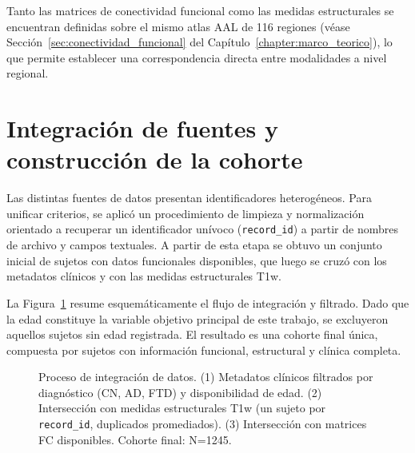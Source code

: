 Tanto las matrices de conectividad funcional como las medidas estructurales se encuentran definidas sobre el mismo atlas AAL de 116 regiones (véase Sección~\ref{sec:conectividad_funcional} del Capítulo~\ref{chapter:marco_teorico}), lo que permite establecer una correspondencia directa entre modalidades a nivel regional.


\section{Integración de fuentes y construcción de la cohorte}
\label{sec:construccion_cohorte}

Las distintas fuentes de datos presentan identificadores heterogéneos. Para unificar criterios, se aplicó un procedimiento de limpieza y normalización orientado a recuperar un identificador unívoco (\texttt{record\_id}) a partir de nombres de archivo y campos textuales. A partir de esta etapa se obtuvo un conjunto inicial de sujetos con datos funcionales disponibles, que luego se cruzó con los metadatos clínicos y con las medidas estructurales T1w.

La Figura~\ref{fig:cohort_flow} resume esquemáticamente el flujo de integración y filtrado. Dado que la edad constituye la variable objetivo principal de este trabajo, se excluyeron aquellos sujetos sin edad registrada. El resultado es una cohorte final única, compuesta por sujetos con información funcional, estructural y clínica completa.

\begin{figure}[H]
\centering
{}
\caption{
Proceso de integración de datos.
(1) Metadatos clínicos filtrados por diagnóstico (CN, AD, FTD) y disponibilidad de edad.
(2) Intersección con medidas estructurales T1w (un sujeto por \texttt{record\_id}, duplicados promediados).
(3) Intersección con matrices FC disponibles. Cohorte final: N=1245.
}
\label{fig:cohort_flow}
\end{figure}


